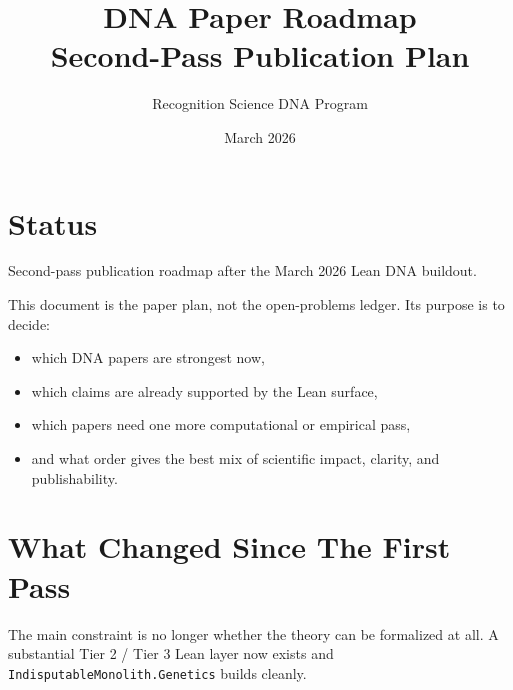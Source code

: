 \documentclass[11pt]{article}
\title{\textbf{DNA Paper Roadmap}\\Second-Pass Publication Plan}
\author{Recognition Science DNA Program}
\date{March 2026}
\begin{document}
\maketitle

\section*{Status}
Second-pass publication roadmap after the March 2026 Lean DNA buildout.

This document is the paper plan, not the open-problems ledger. Its purpose is to decide:
\begin{itemize}
\item which DNA papers are strongest now,
\item which claims are already supported by the Lean surface,
\item which papers need one more computational or empirical pass,
\item and what order gives the best mix of scientific impact, clarity, and publishability.
\end{itemize}

\section*{What Changed Since The First Pass}
The main constraint is no longer whether the theory can be formalized at all. A substantial Tier 2 / Tier 3 Lean layer now exists and \texttt{IndisputableMonolith.Genetics} builds cleanly.
\end{document}

